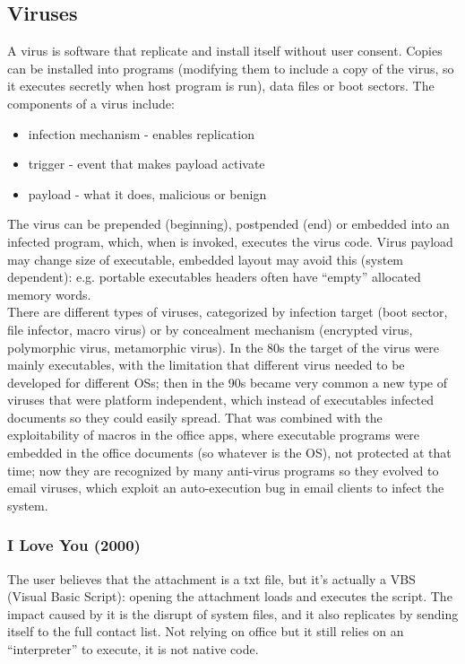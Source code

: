 \documentclass[a4paper, 10pt, titlepage]{article}
\begin{document}
\subsection{Viruses}
A virus is software that replicate and install itself without user consent. Copies can be installed into programs (modifying them to include a copy of the virus, so it executes secretly when host program is run), data files or boot sectors.
The components of a virus include:
\begin{itemize}
	\item infection mechanism - enables replication
	\item trigger - event that makes payload activate
	\item payload - what it does, malicious or benign
\end{itemize}
The virus can be prepended (beginning), postpended (end) or embedded into an infected program, which, when is invoked, executes the virus code. Virus payload may change size of executable, embedded layout may avoid this (system dependent): e.g. portable executables headers often have “empty” allocated memory words. \medskip\\
There are different types of viruses, categorized by infection target (boot sector, file infector, macro virus) or by concealment mechanism (encrypted virus, polymorphic virus, metamorphic virus). In the 80s the target of the virus were mainly executables, with the limitation that different virus needed to be developed for different OSs; then in the 90s became very common a new type of viruses that were platform independent, which instead of executables infected documents so they could easily spread. That was combined with the exploitability of macros in the office apps, where executable programs were embedded in the office documents (so whatever is the OS), not protected at that time; now they are recognized by many anti-virus programs so they evolved to email viruses, which exploit an auto-execution bug in email clients to infect the system.

\subsubsection{I Love You (2000)}
The user believes that the attachment is a txt file, but it’s actually a VBS (Visual Basic Script): opening the attachment loads and executes the script. The impact caused by it is the disrupt of system files, and it also replicates by sending itself to the full contact list.
Not relying on office but it still relies on an “interpreter” to execute, it is not native code.
\end{document}
